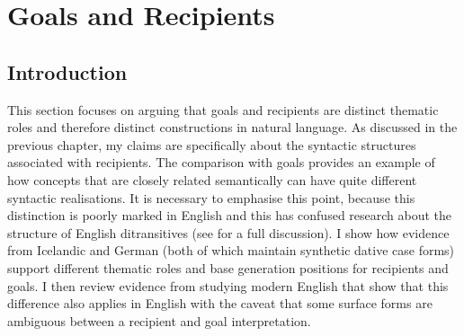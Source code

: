 \section{Goals and Recipients}
	\subsection{Introduction}
	This section focuses on arguing that goals and recipients are distinct thematic roles and therefore distinct constructions in natural language. As discussed in the previous chapter, my claims are specifically about the syntactic structures associated with recipients. The comparison with goals provides an example of how concepts that are closely related semantically can have quite different syntactic realisations. It is necessary to emphasise this point, because this distinction is poorly marked in English and this has confused research about the structure of English ditransitives (see \citet{Hovav.2008} for a full discussion). I show how evidence from Icelandic and German (both of which maintain synthetic dative case forms) support different thematic roles and base generation positions for recipients and goals. I then review evidence from studying modern English that show that this difference also applies in English with the caveat that some surface forms are ambiguous between a recipient and goal interpretation. 

